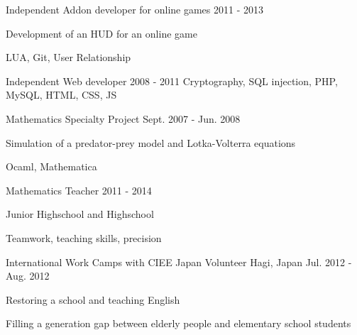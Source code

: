 \begin{cventries}
  \cventrysix
    {} %
    {Independent Addon developer for online games} %
    {} %
    {2011 - 2013} %
    {
      \begin{cvitems} %
        \item {Development of an HUD for an online game}
      \end{cvitems}
    }%
    {LUA, Git, User Relationship}


  \cventryskill
    {} %
    {Independent Web developer} %
    {} %
    {2008 - 2011} %
    {Cryptography, SQL injection, PHP, MySQL, HTML, CSS, JS}


  \cventrysix
    {} %
    {Mathematics Specialty Project} %
    {} %
    {Sept. 2007 - Jun. 2008} %
    {
      \begin{cvitems} %
        \item {Simulation of a predator-prey model and Lotka-Volterra equations}
      \end{cvitems}
    }%
    {Ocaml, Mathematica}


  \cventrysix
    {} %
    {Mathematics Teacher} %
    {} %
    {2011 - 2014} %
    {
      \begin{cvitems} %
        \item {Junior Highschool and Highschool}
      \end{cvitems}
    }%
    {Teamwork, teaching skills, precision}


  \cventry
    {International Work Camps with CIEE Japan} %
    {Volunteer} %
    {Hagi, Japan} %
    {Jul. 2012 - Aug. 2012} %
    {
      \begin{cvitems} %
        \item {Restoring a school and teaching English}
        \item {Filling a generation gap between elderly people and elementary school students}
      \end{cvitems}
    }%

\end{cventries}
